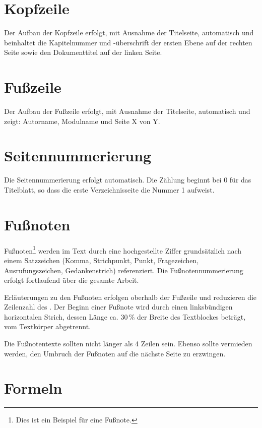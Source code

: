 \section{Kopfzeile}
\label{sec:kopfzeile}

Der Aufbau der Kopfzeile erfolgt, mit Ausnahme der Titelseite, automatisch und beinhaltet die Kapitelnummer und -überschrift der ersten Ebene auf der rechten Seite sowie den Dokumenttitel auf der linken Seite.

\section{Fußzeile}
\label{sec:fusszeile}

Der Aufbau der Fußzeile erfolgt, mit Ausnahme der Titelseite, automatisch und zeigt: Autorname, Modulname und Seite X von Y.

\section{Seitennummerierung}
\label{sec:seitennummerierung}

Die Seitennummerierung erfolgt automatisch. Die Zählung beginnt bei 0 für das Titelblatt, so dass die erste Verzeichnisseite die Nummer 1 aufweist.

\section{Fußnoten}
\label{sec:fussnoten}

Fußnoten\footnote{Dies ist ein Beispiel für eine Fußnote.} werden im Text durch eine hochgestellte Ziffer grundsätzlich nach einem Satzzeichen (Komma, Strichpunkt, Punkt, Fragezeichen, Ausrufungszeichen, Gedankenstrich) referenziert. Die Fußnotennummerierung erfolgt fortlaufend über die gesamte Arbeit.

Erläuterungen zu den Fußnoten erfolgen oberhalb der Fußzeile und reduzieren die Zeilenzahl des . Der Beginn einer Fußnote wird durch einen linksbündigen horizontalen Strich, dessen Länge ca. 30\,\% der Breite des Textblockes beträgt, vom \gls{Textkörper} abgetrennt.

Die Fußnotentexte sollten nicht länger als 4 Zeilen sein. Ebenso sollte vermieden werden, den Umbruch der Fußnoten auf die nächste Seite zu erzwingen.

\section{Formeln}
\label{sec:formeln}


